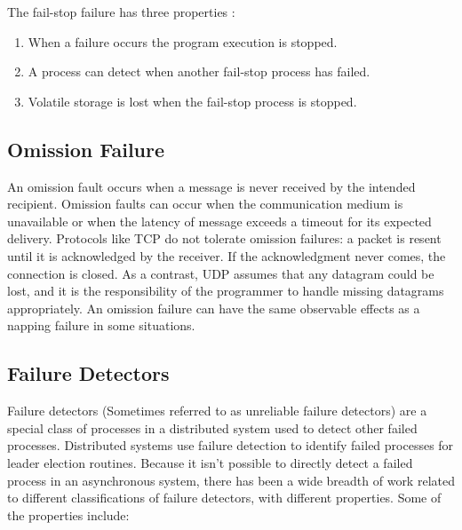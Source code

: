 The fail-stop failure has three properties \cite{DISTRIBUTED}:

\begin{enumerate}
\item When a failure occurs the program execution is stopped.
\item A process can detect when another fail-stop process has failed.
\item Volatile storage is lost when the fail-stop process is stopped.
\end{enumerate}

\subsection{Omission Failure}

An omission fault\cite{OMISSIONFAILURES} occurs when a message is never received by the intended recipient.
Omission faults can occur when the communication medium is unavailable or when the latency of message exceeds a timeout for its expected delivery.
Protocols like TCP do not tolerate omission failures: a packet is resent until it is acknowledged by the receiver.
If the acknowledgment never comes, the connection is closed.
As a contrast, UDP assumes that any datagram could be lost, and it is the responsibility of the programmer to handle missing datagrams appropriately.
An omission failure can have the same observable effects as a napping failure in some situations.\cite{DISTRIBUTED}


\subsection{Failure Detectors}

Failure detectors\cite{FAILUREDETECTORS} (Sometimes referred to as unreliable failure detectors) are a special class of processes in a distributed system used to detect other failed processes.
Distributed systems use failure detection to identify failed processes for leader election routines.
Because it isn't possible to directly detect a failed process in an asynchronous system, there has been a wide breadth of work related to different classifications of failure detectors, with different properties.
Some of the properties include\cite{FAILUREDETECTORS}:

